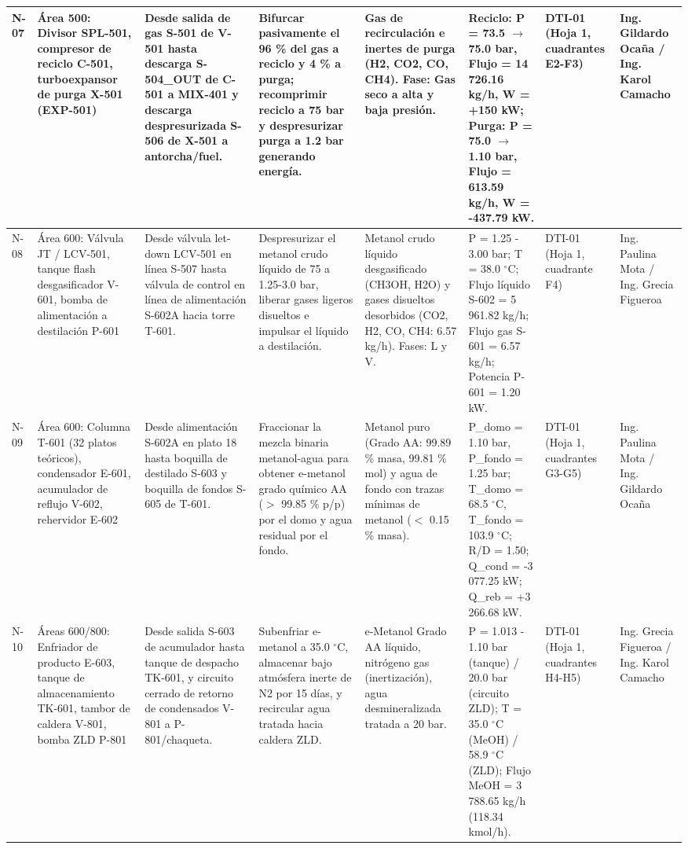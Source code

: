 \documentclass[10pt,letterpaper]{article}
\begin{document}
\begin{landscape}
\begin{table}[H]
\begin{tabularx}{\linewidth}{|l|p{2.8cm}|p{3.2cm}|X|p{2.6cm}|p{2.8cm}|p{1.8cm}|p{2.4cm}|}
N-07 & Área 500: Divisor SPL-501, compresor de reciclo C-501, turboexpansor de purga X-501 (EXP-501) & Desde salida de gas S-501 de V-501 hasta descarga S-504\_OUT de C-501 a MIX-401 y descarga despresurizada S-506 de X-501 a antorcha/fuel. & Bifurcar pasivamente el 96 \% del gas a reciclo y 4 \% a purga; recomprimir reciclo a 75 bar y despresurizar purga a 1.2 bar generando energía. & Gas de recirculación e inertes de purga (H2, CO2, CO, CH4). Fase: Gas seco a alta y baja presión. & Reciclo: P = 73.5 $\to$ 75.0 bar, Flujo = 14 726.16 kg/h, W = +150 kW; Purga: P = 75.0 $\to$ 1.10 bar, Flujo = 613.59 kg/h, W = -437.79 kW. & DTI-01 (Hoja 1, cuadrantes E2-F3) & Ing. Gildardo Ocaña / Ing. Karol Camacho \\ \hline
N-08 & Área 600: Válvula JT / LCV-501, tanque flash desgasificador V-601, bomba de alimentación a destilación P-601 & Desde válvula let-down LCV-501 en línea S-507 hasta válvula de control en línea de alimentación S-602A hacia torre T-601. & Despresurizar el metanol crudo líquido de 75 a 1.25-3.0 bar, liberar gases ligeros disueltos e impulsar el líquido a destilación. & Metanol crudo líquido desgasificado (CH3OH, H2O) y gases disueltos desorbidos (CO2, H2, CO, CH4: 6.57 kg/h). Fases: L y V. & P = 1.25 - 3.00 bar; T = 38.0 $^\circ$C; Flujo líquido S-602 = 5 961.82 kg/h; Flujo gas S-601 = 6.57 kg/h; Potencia P-601 = 1.20 kW. & DTI-01 (Hoja 1, cuadrante F4) & Ing. Paulina Mota / Ing. Grecia Figueroa \\ \hline
N-09 & Área 600: Columna T-601 (32 platos teóricos), condensador E-601, acumulador de reflujo V-602, rehervidor E-602 & Desde alimentación S-602A en plato 18 hasta boquilla de destilado S-603 y boquilla de fondos S-605 de T-601. & Fraccionar la mezcla binaria metanol-agua para obtener e-metanol grado químico AA ($>$ 99.85 \% p/p) por el domo y agua residual por el fondo. & Metanol puro (Grado AA: 99.89 \% masa, 99.81 \% mol) y agua de fondo con trazas mínimas de metanol ($<$ 0.15 \% masa). & P\_domo = 1.10 bar, P\_fondo = 1.25 bar; T\_domo = 68.5 $^\circ$C, T\_fondo = 103.9 $^\circ$C; R/D = 1.50; Q\_cond = -3 077.25 kW; Q\_reb = +3 266.68 kW. & DTI-01 (Hoja 1, cuadrantes G3-G5) & Ing. Paulina Mota / Ing. Gildardo Ocaña \\ \hline
N-10 & Áreas 600/800: Enfriador de producto E-603, tanque de almacenamiento TK-601, tambor de caldera V-801, bomba ZLD P-801 & Desde salida S-603 de acumulador hasta tanque de despacho TK-601, y circuito cerrado de retorno de condensados V-801 a P-801/chaqueta. & Subenfriar e-metanol a 35.0 $^\circ$C, almacenar bajo atmósfera inerte de N2 por 15 días, y recircular agua tratada hacia caldera ZLD. & e-Metanol Grado AA líquido, nitrógeno gas (inertización), agua desmineralizada tratada a 20 bar. & P = 1.013 - 1.10 bar (tanque) / 20.0 bar (circuito ZLD); T = 35.0 $^\circ$C (MeOH) / 58.9 $^\circ$C (ZLD); Flujo MeOH = 3 788.65 kg/h (118.34 kmol/h). & DTI-01 (Hoja 1, cuadrantes H4-H5) & Ing. Grecia Figueroa / Ing. Karol Camacho \\ \hline
\end{tabularx}
\end{table}
\end{landscape}
\end{document}
